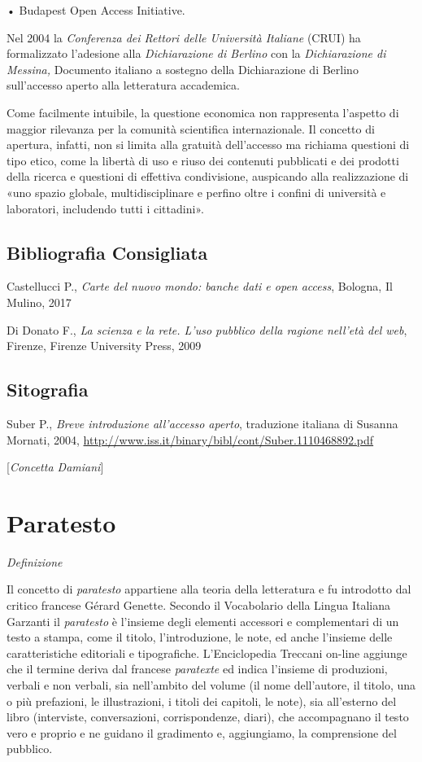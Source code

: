 • Budapest Open Access Initiative.

Nel 2004 la \emph{Conferenza dei Rettori delle Università Italiane}
(CRUI) ha formalizzato l'adesione alla \emph{Dichiarazione di Berlino}
con la \emph{Dichiarazione di Messina,} Documento italiano a sostegno
della Dichiarazione di Berlino sull'accesso aperto alla letteratura
accademica.

Come facilmente intuibile, la questione economica non rappresenta
l'aspetto di maggior rilevanza per la comunità scientifica
internazionale. Il concetto di apertura, infatti, non si limita alla
gratuità dell'accesso ma richiama questioni di tipo etico, come la
libertà di uso e riuso dei contenuti pubblicati e dei prodotti della
ricerca e questioni di effettiva condivisione, auspicando alla
realizzazione di «uno spazio globale, multidisciplinare e perfino oltre
i confini di università e laboratori, includendo tutti i cittadini».

\section*{Bibliografia Consigliata}
{\parindent0pt 
Castellucci P., \emph{Carte del nuovo mondo: banche dati e open access},
Bologna, Il Mulino, 2017

Di Donato F., \emph{La scienza e la rete. L'uso pubblico della ragione
nell'età del web}, Firenze, Firenze University Press, 2009
}

\section*{Sitografia}
{\parindent0pt 
Suber P., \emph{Breve introduzione all'accesso aperto}, traduzione
italiana di Susanna Mornati, 2004,
\url{http://www.iss.it/binary/bibl/cont/Suber.1110468892.pdf}

}

\hrulefill 
 
{[}\emph{Concetta Damiani}{]}




\chapter{Paratesto}

\emph{Definizione}

Il concetto di \emph{paratesto} appartiene alla teoria della letteratura
e fu introdotto dal critico francese Gérard Genette. Secondo il
Vocabolario della Lingua Italiana Garzanti il \emph{paratesto} è
l'insieme degli elementi accessori e complementari di un testo a stampa,
come il titolo, l'introduzione, le note, ed anche l'insieme delle
caratteristiche editoriali e tipografiche. L'Enciclopedia Treccani
on-line aggiunge che il termine deriva dal francese \emph{paratexte} ed
indica l'insieme di produzioni, verbali e non verbali, sia nell'ambito
del volume (il nome dell'autore, il titolo, una o più prefazioni, le
illustrazioni, i titoli dei capitoli, le note), sia all'esterno del
libro (interviste, conversazioni, corrispondenze, diari), che
accompagnano il testo vero e proprio e ne guidano il gradimento e,
aggiungiamo, la comprensione del pubblico.

